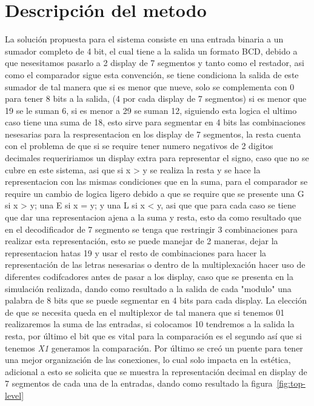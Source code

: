 \documentclass[a4paper, 12pt]{article}
\begin{document}
    \section{Descripción del metodo}
    La solución propuesta para el sistema consiste en una entrada binaria a un sumador completo de 4 bit, el cual tiene a la salida un formato BCD, debido a que nesesitamos pasarlo a 2 display de 7 segmentos y tanto como el restador, asi como el comparador sigue esta convención, se tiene condiciona la salida de este sumador de tal manera que si es menor que nueve, solo se complementa con 0 para tener 8 bits a la salida, (4 por cada display de 7 segmentos) si es menor que 19 se le suman 6, si es menor a 29 se suman 12, siguiendo esta logica el ultimo caso tiene una suma de 18, esto sirve para segmentar en 4 bits las combinaciones nesesarias para la respresentacion en los display de 7 segmentos, la resta cuenta con el problema de que si se require tener numero negativos de 2 digitos decimales requeririamos un display extra para representar el signo, caso que no se cubre en este sistema, asi que si x > y se realiza la resta y se hace la representacion con las mismas condiciones que en la suma, para el comparador se require un cambio de logica ligero debido a que se require que se presente una G si x > y; una E si x = y; y una L si x < y, asi que que para cada caso se tiene que dar una representacion ajena a la suma y resta, esto da como resultado que en el decodificador de 7 segmento se tenga que restringir 3 combinaciones para realizar esta representación, esto se puede manejar de 2 maneras, dejar la representacion hatas 19 y usar el resto de combinaciones para hacer la representación de las letras nesesarias o dentro de la multiplexación hacer uso de diferentes codifcadores antes de pasar a los display, caso que se presenta en la simulación realizada, dando como resultado a la salida de cada "modulo" una palabra de 8 bits que se puede segmentar en 4 bits para cada display.
    La elección de que se necesita queda en el multiplexor de tal manera que si tenemos 01 realizaremos la suma de las entradas, si colocamos 10 tendremos a la salida la resta, por último el bit que es vital para la comparación es el segundo así que si tenemos \emph{X1} generamos la comparación. Por último se creó un puente para tener una mejor organización de las conexiones, lo cual solo impacta en la estética, adicional a esto se solicita que se muestra la representación decimal en display de 7 segmentos de cada una de la entradas, dando como resultado la figura~\ref{fig:top-level}
\end{document}
